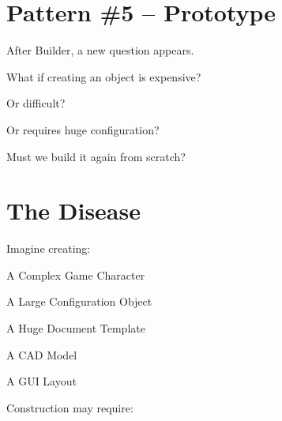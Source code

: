 \documentclass[11pt,a4paper]{book}
\begin{document}
\section{Pattern \#5 -- Prototype}

After Builder, a new question appears.


What if creating an object
is expensive?


Or difficult?


Or requires huge configuration?


Must we build it again from scratch?


\section{The Disease}

Imagine creating:


A Complex Game Character


A Large Configuration Object


A Huge Document Template


A CAD Model


A GUI Layout


Construction may require:

\end{document}
